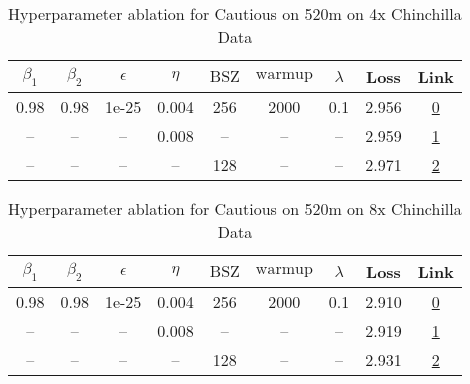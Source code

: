 \begin{table}[H]
\centering
\caption{Hyperparameter ablation for Cautious on 520m on 4x Chinchilla Data}
\label{tab:ablation_cautious_520m_4}
\begin{tabular}{ccccccccc}
\toprule
$\beta_1$ & $\beta_2$ & $\epsilon$ & $\eta$ & $\mathrm{BSZ}$ & $\mathrm{warmup}$ & $\lambda$ & Loss & Link \\
\midrule
0.98 & 0.98 & 1e-25 & 0.004 & 256 & 2000 & 0.1 & 2.956 & \href{https://wandb.ai/stanford-mercury/optimizer-scaling/runs/sweep-520m-42B-cautious553798lr0.004-wd0.1-minlr0-warmup2000-b10-e08bbe}{0} \\
\midrule
-- & -- & -- & 0.008 & -- & -- & -- & 2.959 & \href{https://wandb.ai/stanford-mercury/optimizer-scaling/runs/sweep-520m-42B-cautiousd91085lr0.008-wd0.1-minlr0-warmup2000-b10-50463b}{1} \\
-- & -- & -- & -- & 128 & -- & -- & 2.971 & \href{https://wandb.ai/stanford-mercury/optimizer-scaling/runs/sweep-520m-42B-cautious6977a2lr0.004-wd0.1-minlr0-warmup2000-b10-27d459}{2} \\
\bottomrule
\end{tabular}
\end{table}

\begin{table}[H]
\centering
\caption{Hyperparameter ablation for Cautious on 520m on 8x Chinchilla Data}
\label{tab:ablation_cautious_520m_8}
\begin{tabular}{ccccccccc}
\toprule
$\beta_1$ & $\beta_2$ & $\epsilon$ & $\eta$ & $\mathrm{BSZ}$ & $\mathrm{warmup}$ & $\lambda$ & Loss & Link \\
\midrule
0.98 & 0.98 & 1e-25 & 0.004 & 256 & 2000 & 0.1 & 2.910 & \href{https://wandb.ai/stanford-mercury/optimizer-scaling/runs/sweep-520m-85B-cautious66b1b7lr0.004-wd0.1-minlr0-warmup2000-b10-d99a40}{0} \\
\midrule
-- & -- & -- & 0.008 & -- & -- & -- & 2.919 & \href{https://wandb.ai/stanford-mercury/optimizer-scaling/runs/sweep-520m-85B-cautious33285clr0.008-wd0.1-minlr0-warmup2000-b10-260c3f}{1} \\
-- & -- & -- & -- & 128 & -- & -- & 2.931 & \href{https://wandb.ai/stanford-mercury/optimizer-scaling/runs/sweep-520m-85B-cautious8ee009lr0.004-wd0.1-minlr0-warmup2000-b10-2ee0a2}{2} \\
\bottomrule
\end{tabular}
\end{table}

